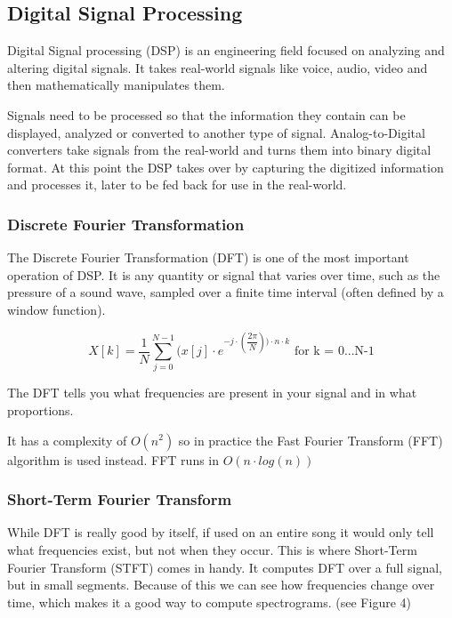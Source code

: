 \subsection{Digital Signal Processing}
Digital Signal processing (DSP) is an engineering field focused on analyzing and altering digital signals. It takes real-world signals like voice, audio, video and then mathematically manipulates them. \cite{dsp} \par

Signals need to be processed so that the information they contain can be displayed, analyzed or converted to another type of signal. Analog-to-Digital converters take signals from the real-world and turns them into binary digital format. At this point the DSP takes over by capturing the digitized information and processes it, later to be fed back for use in the real-world. \par

\subsubsection{Discrete Fourier Transformation}
The Discrete Fourier Transformation (DFT) is one of the most important operation of DSP. It is any quantity or signal that varies over time, such as the pressure of a sound wave, sampled over a finite time interval (often defined by a window function). \cite{discrete} \par

\begin{equation}
X[k] = \dfrac{1}{N} \sum_{j=0}^{N-1}(x[j] \cdot e^ {-j \cdot( \dfrac{2\pi}{N}) ) \cdot n \cdot k }  \text{ for k = 0...N-1}
\end{equation}

The DFT tells you what frequencies are present in your signal and in what proportions.
\par
It has a complexity of $O(n^2)$ so in practice the Fast Fourier Transform (FFT) algorithm is used instead. FFT runs in $O(n\cdot log(n))$

\subsubsection{Short-Term Fourier Transform}
While DFT is really good by itself, if used on an entire song it would only tell what frequencies exist, but not when they occur. This is where Short-Term Fourier Transform (STFT) comes in handy. It computes DFT over a full signal, but in small segments. Because of this we can see how frequencies change over time, which makes it a good way to compute spectrograms. (see Figure 4) 

